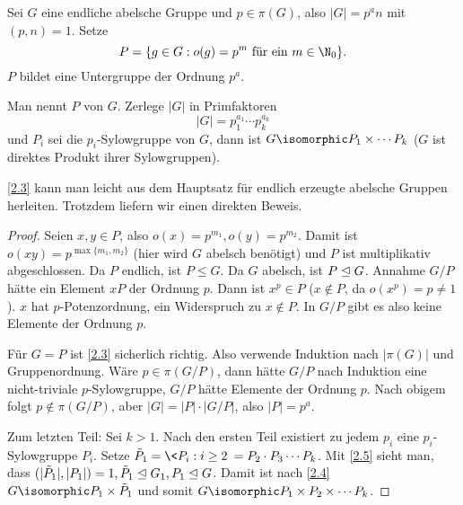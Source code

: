 \begin{st} \label{2.3}
	Sei $G$ eine endliche abelsche Gruppe und $p \in \pi(G)$, also $|G| = p^a n$ mit $(p, n) = 1$.
	Setze
	\[
		P = \{ g \in G : o(g) = p^m \text{ für ein $m \in \N_0$} \}.
	\]
	$P$ bildet eine Untergruppe der Ordnung $p^a$.

	Man nennt $P$  von $G$.
	Zerlege $|G|$ in Primfaktoren
	\[
		|G| = p_1^{a_1} \dotsb p_k^{a_k}
	\]
	und $P_i$ sei die $p_i$-Sylowgruppe von $G$, dann ist $G \isomorphic P_1 \times \dotsb P_k$ ($G$ ist direktes Produkt ihrer Sylowgruppen).
	\begin{note}
		\ref{2.3} kann man leicht aus dem Hauptsatz für endlich erzeugte abelsche Gruppen herleiten.
		Trotzdem liefern wir einen direkten Beweis.
	\end{note}
	\begin{proof}
		Seien $x, y \in P$, also $o(x) = p^{m_1}, o(y) = p^{m_2}$.
		Damit ist $o(xy) = p^{\max\{m_1, m_2\}}$ (hier wird $G$ abelsch benötigt) und $P$ ist multiplikativ abgeschlossen.
		Da $P$ endlich, ist $P \le G$.
		Da $G$ abelsch, ist $P \trianglelefteq G$.
		Annahme $G / P$ hätte ein Element $xP$ der Ordnung $p$.
		Dann ist $x^p \in P$ ($x \not\in P$, da $o(x^p) = p \neq 1$).
		$x$ hat $p$-Potenzordnung, ein Widerspruch zu $x \not\in P$.
		In $G / P$ gibt es also keine Elemente der Ordnung $p$.

		Für $G = P$ ist \ref{2.3} sicherlich richtig.
		Also verwende Induktion nach $|\pi(G)|$ und Gruppenordnung.
		Wäre $p \in \pi(G / P)$, dann hätte $G / P$ nach Induktion eine nicht-triviale $p$-Sylowgruppe, $G / P$ hätte Elemente der Ordnung $p$.
		Nach obigem folgt $p \not\in \pi(G / P)$, aber $|G| = |P| \cdot |G / P|$, also $|P| = p^a$.

		Zum letzten Teil:
		Sei \oBdA $k > 1$.
		Nach den ersten Teil existiert zu jedem $p_i$ eine $p_i$-Sylowgruppe $P_i$.
		Setze $\tilde P_1 = \< P_i : i \ge 2 \> = P_2 \cdot P_3 \dotsb P_k$.
		Mit \ref{2.5} sieht man, dass $(|\tilde P_1|, |P_1|) = 1, \tilde P_1 \trianglelefteq G_1, P_1 \trianglelefteq G$.
		Damit ist nach \ref{2.4} $G \isomorphic P_1 \times \tilde P_1$ und somit $G \isomorphic P_1 \times P_2 \times \dotsb P_k$.
	\end{proof}
\end{st}


